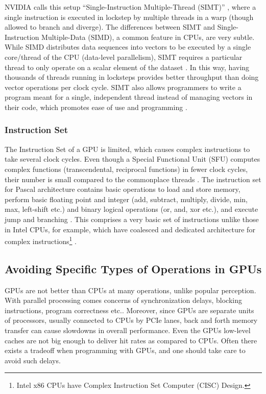 NVIDIA calls this setup ``Single-Instruction Multiple-Thread (SIMT)'' \cite{CUDADocs} \cite[Appendix~B.4]{PattersonARM}, where a single instruction is executed in lockstep by multiple threads in a warp (though allowed to branch and diverge). The differences between SIMT and Single-Instruction Multiple-Data (SIMD), a common feature in CPUs, are very subtle. While SIMD distributes data sequences into vectors to be executed by a single core/thread of the CPU (data-level parallelism), SIMT requires a particular thread to only operate on a scalar element of the dataset  \cite{PattersonARM}. In this way, having thousands of threads running in locksteps provides better throughput than doing vector operations per clock cycle. SIMT also allows programmers to write a program meant for a single, independent thread instead of managing vectors in their code, which promotes ease of use and programming \cite[Chapter~4]{CUDADocs}.

\subsubsection{Instruction Set}
The Instruction Set of a GPU is limited, which causes complex instructions to take several clock cycles. Even though a Special Functional Unit (SFU) computes complex functions (transcendental, reciprocal functions) in fewer clock cycles, their number is small compared to the commonplace threads \cite[Appendix~B]{PattersonARM}. The instruction set for Pascal architecture contains basic operations to load and store memory, perform basic floating point and integer (add, subtract, multiply, divide, min, max, left-shift etc.) and binary logical operations (or, and, xor etc.), and execute jump and branching \cite{CUDABinUtils, DemystifyingGPU}. This comprises a very basic set of instructions unlike those in Intel CPUs, for example, which have coalesced and dedicated architecture for complex instructions\footnote{Intel x86 CPUs have Complex Instruction Set Computer (CISC) Design.} \cite{PattersonARM}.

\subsection{Avoiding Specific Types of Operations in GPUs} \label{sec:Avoiding Specific Operations in GPUs}
GPUs are not better than CPUs at many operations, unlike popular perception. With parallel processing comes concerns of synchronization delays, blocking instructions, program correctness etc.. Moreover, since GPUs are separate units of processors, usually connected to CPUs by PCIe lanes, back and forth memory transfer can cause slowdowns in overall performance. Even the GPUs low-level caches are not big enough to deliver hit rates as compared to CPUs. Often there exists a tradeoff when programming with GPUs, and one should take care to avoid such delays.

